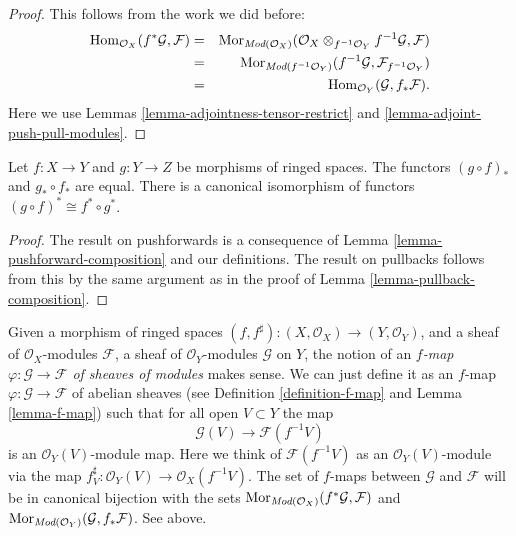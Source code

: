 \begin{proof}
This follows from the work we did before:
\begin{eqnarray*}
\mathop{\mathrm{Hom}}\nolimits_{\mathcal{O}_X}(f^*\mathcal{G}, \mathcal{F})
& = &
\mathop{\mathrm{Mor}}\nolimits_{\textit{Mod}(\mathcal{O}_X)}(
\mathcal{O}_X \otimes_{f^{-1}\mathcal{O}_Y} f^{-1}\mathcal{G}, \mathcal{F}) \\
& = &
\mathop{\mathrm{Mor}}\nolimits_{\textit{Mod}(f^{-1}\mathcal{O}_Y)}(
f^{-1}\mathcal{G}, \mathcal{F}_{f^{-1}\mathcal{O}_Y}) \\
& = &
\mathop{\mathrm{Hom}}\nolimits_{\mathcal{O}_Y}(\mathcal{G}, f_*\mathcal{F}).
\end{eqnarray*}
Here we use Lemmas \ref{lemma-adjointness-tensor-restrict}
and \ref{lemma-adjoint-push-pull-modules}.
\end{proof}

\begin{lemma}
\label{lemma-push-pull-composition-modules}
Let $f : X \to Y$ and $g : Y \to Z$ be morphisms of ringed spaces.
The functors $(g \circ f)_*$ and $g_* \circ f_*$ are equal.
There is a canonical isomorphism of functors
$(g \circ f)^* \cong f^* \circ g^*$.
\end{lemma}

\begin{proof}
The result on pushforwards is a consequence of Lemma
\ref{lemma-pushforward-composition} and our definitions.
The result on pullbacks follows from this by the same
argument as in the proof of Lemma \ref{lemma-pullback-composition}.
\end{proof}


\noindent
Given a morphism of ringed spaces
$(f, f^\sharp) : (X, \mathcal{O}_X) \to (Y, \mathcal{O}_Y)$,
and a sheaf of $\mathcal{O}_X$-modules $\mathcal{F}$,
a sheaf of $\mathcal{O}_Y$-modules $\mathcal{G}$ on $Y$,
the notion of an {\it $f$-map $\varphi : \mathcal{G} \to \mathcal{F}$
of sheaves of modules} makes sense. We can just define
it as an $f$-map $\varphi : \mathcal{G} \to \mathcal{F}$
of abelian sheaves (see Definition \ref{definition-f-map} and
Lemma \ref{lemma-f-map}) such that for all open $V \subset Y$ the map
$$
\mathcal{G}(V) \longrightarrow \mathcal{F}(f^{-1}V)
$$
is an $\mathcal{O}_Y(V)$-module map. Here we think of
$\mathcal{F}(f^{-1}V)$ as an $\mathcal{O}_Y(V)$-module
via the map $f^\sharp_V : \mathcal{O}_Y(V) \to \mathcal{O}_X(f^{-1}V)$.
The set of $f$-maps between
$\mathcal{G}$ and $\mathcal{F}$ will be in canonical bijection
with the sets
$\mathop{\mathrm{Mor}}\nolimits_{\textit{Mod}(\mathcal{O}_X)}(f^*\mathcal{G}, \mathcal{F})$
and
$\mathop{\mathrm{Mor}}\nolimits_{\textit{Mod}(\mathcal{O}_Y)}(\mathcal{G}, f_*\mathcal{F})$.
See above.


